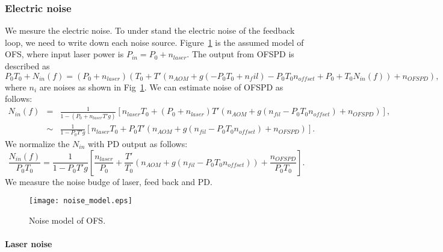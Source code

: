 			\begin{center}
			\end{center}
\subsubsection{Electric noise}
We mesure the electric noise. To under stand the electric noise of the feedback loop, we need to write down each noise source.
Figure~\ref{fig:noise} is the assumed model of OFS, where input laser power is $P_{in}=P_0 + n_{laser}$.
The output from OFSPD is described as
\begin{equation}
P_0 T_0 +N_{in}(f) = (P_0 +n_{laser})(T_0+T'(n_{AOM}+g(-P_0 T_0+n_fil)-P_0 T_0 n_{offset} +P_0 +T_0 N_{in}(f))+n_{OFSPD}),
\end{equation}
where $n_{i}$ are noises as shown in Fig~\ref{fig:noise}. We can estimate noise of OFSPD as follows:
\begin{eqnarray}
N_{in}(f)&=&\frac{1}{1-(P_0+n_{laser}T'g)}[n_{laser}T_0 + (P_0+n_{laser})T'(n_{AOM}+g(n_{fil}-P_0T_0n_{offset})+n_{OFSPD})], \nonumber \\
&\sim&\frac{1}{1-P_0T'g}[n_{laser}T_0 + P_0T'(n_{AOM}+g(n_{fil}-P_0T_0n_{offset})+n_{OFSPD})].
\end{eqnarray}
We normalize the $N_{in}$ with PD output as follows:
\begin{equation}
\frac{N_{in}(f)}{P_0T_0}=\frac{1}{1-P_0T'g}[\frac{n_{laser}}{P_0} + \frac{T'}{T_0}(n_{AOM}+g(n_{fil}-P_0T_0n_{offset}))+\frac{n_{OFSPD}}{P_0T_0}].
\end{equation}
 We measure the noise budge of laser, feed back and PD.
\begin{figure}
\begin{center}
\texttt{[image: noise\_model.eps]}
\caption{Noise model of OFS.} 
\label{fig:noise} 
\end{center}
\end{figure}

\paragraph{Laser noise}
